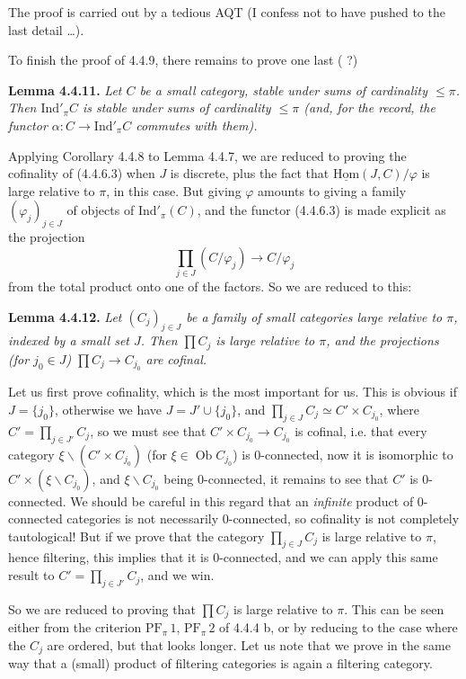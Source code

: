 \documentclass[11pt]{article}
\newcommand{\printedpage}[1]{\marginpar{\footnotesize p.~#1}}
\newcommand{\msp}[1]{\marginpar{\footnotesize [#1]}}
\newcommand{\uHom}{\underline{\mathrm{Hom}}}
\newcommand{\Ind}{\mathrm{Ind}}
\newcommand{\Ob}{\operatorname{Ob}}
\begin{document}
\msp{page 92}
The proof is carried out by a tedious AQT (I confess not to have pushed to the last detail \ldots).

To finish the proof of 4.4.9, there remains to prove one last ( ?)

\textbf{Lemma 4.4.11.} \textit{Let $C$ be a small category, stable under sums of cardinality $\leqslant \pi$. Then $\Ind'_\pi C$ is stable under sums of cardinality $\leqslant \pi$ (and, for the record, the functor $\alpha : C \longrightarrow \Ind'_\pi C$ commutes with them).}

Applying Corollary 4.4.8 to Lemma 4.4.7, we are reduced to proving the cofinality of (4.4.6.3) when $J$ is discrete, plus the fact that $\uHom(J,C)/\varphi$ is large relative to $\pi$, in this case. But giving $\varphi$ amounts to giving a family $(\varphi_j)_{j\in J}$ of objects of $\Ind'_\pi(C)$, and the functor (4.4.6.3) is made explicit as the projection
\[
\prod_{j\in J} (C/\varphi_j) \longrightarrow C/\varphi_j
\]
from the total product onto one of the factors. So we are reduced to this:

\msp{page 93}
\textbf{Lemma 4.4.12.} \textit{Let $(C_j)_{j\in J}$ be a family of small categories large relative to $\pi$, indexed by a small set $J$. Then $\prod C_j$ is large relative to $\pi$, and the projections (for $j_0 \in J$) $\prod C_j \longrightarrow C_{j_0}$ are cofinal.}

Let us first prove cofinality, which is the most important for us. This is obvious if $J = \{j_0\}$, otherwise we have $J = J' \cup \{j_0\}$, and $\prod_{j\in J} C_j \simeq C' \times C_{j_0}$, where $C' = \prod_{j\in J'} C_j$, so we must see that $C' \times C_{j_0} \longrightarrow C_{j_0}$ is cofinal, i.e. that every category $\xi\backslash(C' \times C_{j_0})$ (for $\xi \in \Ob C_{j_0}$) is 0-connected, now it is isomorphic to $C' \times (\xi\backslash C_{j_0})$, and $\xi\backslash C_{j_0}$ being 0-connected, it remains to see that $C'$ is 0-connected. We should be careful in this regard that an \textit{infinite} product of 0-connected categories is not necessarily 0-connected, so cofinality is not completely tautological! But if we prove that the category $\prod_{j\in J} C_j$ is
\printedpage{23}
\msp{page 94}
large relative to $\pi$, hence filtering, this implies that it is 0-connected, and we can apply this same result to $C' = \prod_{j\in J'} C_j$, and we win.

So we are reduced to proving that $\prod C_j$ is large relative to $\pi$. This can be seen either from the criterion $\mathrm{PF}_\pi\,1$, $\mathrm{PF}_\pi\,2$ of 4.4.4 b, or by reducing to the case where the $C_j$ are ordered, but that looks longer. Let us note that we prove in the same way that a (small) product of filtering categories is again a filtering category.
\end{document}
